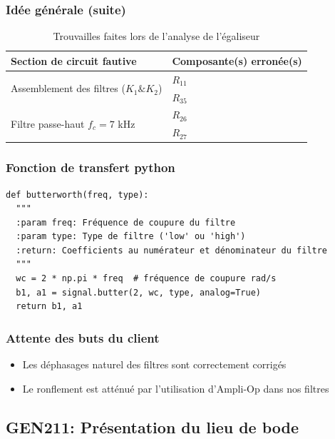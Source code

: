 \documentclass[10pt]{beamer}\usepackage[]{graphicx}\usepackage[]{xcolor}
\makeatletter
\newenvironment{kframe}{%
 \def\at@end@of@kframe{}%
 \ifinner\ifhmode%
  \def\at@end@of@kframe{\end{minipage}}%
  \begin{minipage}{\columnwidth}%
 \fi\fi%
 \def\FrameCommand##1{\hskip\@totalleftmargin \hskip-\fboxsep
 \colorbox{shadecolor}{##1}\hskip-\fboxsep
     \hskip-\linewidth \hskip-\@totalleftmargin \hskip\columnwidth}%
 \MakeFramed {\advance\hsize-\width
   \@totalleftmargin\z@ \linewidth\hsize
   \@setminipage}}%
 {\par\unskip\endMakeFramed%
 \at@end@of@kframe}
\newenvironment{knitrout}{}{} %
\makeatother
\begin{document}
\begin{frame}
\frametitle{Idée générale (suite)}
\begin{table}
  \centering
  \caption{Trouvailles faites lors de l'analyse de l'égaliseur}
  \label{tab:wrong-components}
  \begin{tabular}{ll}
    \toprule
    \textbf{Section de circuit fautive} & \textbf{Composante(s) erronée(s)} \\
    \midrule
    \multirow{2}{*}{Assemblement des filtres ($K_1 \& K_2$)} & $R_{11}$ \\
    & $R_{35}$ \\
    \midrule
    \multirow{2}{*}{Filtre passe-haut $f_c=7$ kHz} & $R_{26}$ \\
    & $R_{27}$ \\
    \bottomrule
  \end{tabular}
\end{table}
\end{frame}

\begin{frame}[fragile]
\frametitle{Fonction de transfert python}
\begin{knitrout}\footnotesize
{}\color{fgcolor}\begin{kframe}
\begin{verbatim}
def butterworth(freq, type):
  """
  :param freq: Fréquence de coupure du filtre
  :param type: Type de filtre ('low' ou 'high')
  :return: Coefficients au numérateur et dénominateur du filtre
  """
  wc = 2 * np.pi * freq  # fréquence de coupure rad/s
  b1, a1 = signal.butter(2, wc, type, analog=True)
  return b1, a1
\end{verbatim}
\end{kframe}
\end{knitrout}
\end{frame}

\begin{frame}[fragile]
\frametitle{Attente des buts du client}
\begin{itemize}
  \item Les déphasages naturel des filtres sont correctement corrigés
  \item Le ronflement est atténué par l'utilisation d'Ampli-Op dans nos filtres
\end{itemize}
\end{frame}

\subsection{GEN211: Présentation du lieu de bode}
\end{document}
